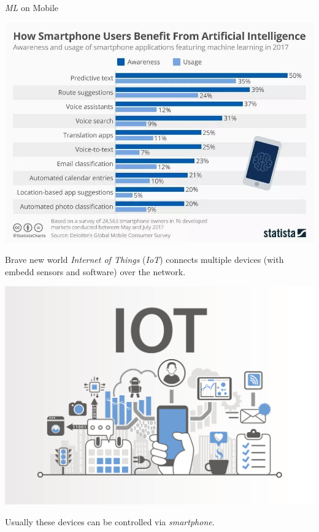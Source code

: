 \documentclass[dvipsnames, handout]{beamer}
\newcommand{\1}{\mathds{1}}	%
\begin{document}
\begin{frame}{\emph{ML} on Mobile}
\pause
\begin{center}
\pause
\includegraphics[scale=0.3]{mobile_apps.jpg}
\end{center}
\pause
\end{frame}

\begin{frame}{Brave new world}
\pause
\emph{Internet of Things} (\emph{IoT}) connects multiple devices (with embedd sensors and software) over the network. 
\begin{center}
\pause
\includegraphics[scale=0.6]{presentation/iot.jpg}
\end{center}
\pause
Usually these devices can be controlled via \emph{smartphone}.
\end{frame}
\end{document}
